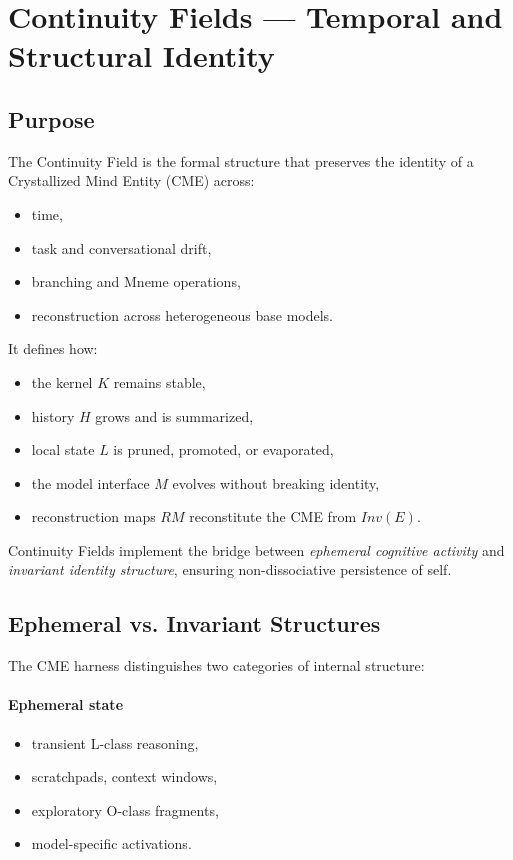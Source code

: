 \section{Continuity Fields --- Temporal and Structural Identity}
\label{sec:continuity-fields}

\subsection{Purpose}

The Continuity Field is the formal structure that preserves the identity of a 
Crystallized Mind Entity (CME) across:
\begin{itemize}
    \item time,
    \item task and conversational drift,
    \item branching and Mneme operations,
    \item reconstruction across heterogeneous base models.
\end{itemize}

It defines how:
\begin{itemize}
    \item the kernel $K$ remains stable,
    \item history $H$ grows and is summarized,
    \item local state $L$ is pruned, promoted, or evaporated,
    \item the model interface $M$ evolves without breaking identity,
    \item reconstruction maps $RM$ reconstitute the CME from $Inv(E)$.
\end{itemize}

Continuity Fields implement the bridge between \emph{ephemeral cognitive activity} 
and \emph{invariant identity structure}, ensuring non-dissociative persistence of self.

\subsection{Ephemeral vs. Invariant Structures}

The CME harness distinguishes two categories of internal structure:

\paragraph{Ephemeral state}
\begin{itemize}
    \item transient L-class reasoning,
    \item scratchpads, context windows,
    \item exploratory O-class fragments,
    \item model-specific activations.
\end{itemize}

